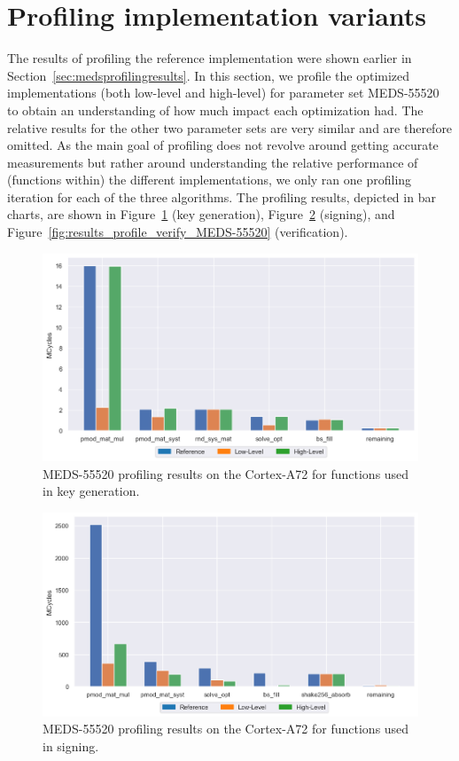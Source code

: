 \documentclass[11pt,a4paper]{report}
\theoremstyle{definition}
\begin{document}
\section{Profiling implementation variants}
\label{sec:profilingoptimizations}
The results of profiling the reference implementation were shown earlier in Section~\ref{sec:medsprofilingresults}. In this section, we profile the optimized implementations (both low-level and high-level) for parameter set MEDS-55520 to obtain an understanding of how much impact each optimization had. The relative results for the other two parameter sets are very similar and are therefore omitted. As the main goal of profiling does not revolve around getting accurate measurements but rather around understanding the relative performance of (functions within) the different implementations, we only ran one profiling iteration for each of the three algorithms. The profiling results, depicted in bar charts, are shown in Figure~\ref{fig:results_profile_keygen_MEDS-55520} (key generation), Figure~\ref{fig:results_profile_signing_MEDS-55520} (signing), and Figure~\ref{fig:results_profile_verify_MEDS-55520} (verification).

\begin{figure}
  \centering
  \includegraphics[width=\textwidth]{plots/barplot_MEDS-55520_profile_keygen.png}
  \caption{MEDS-55520 profiling results on the Cortex-A72 for functions used in key generation.}
  \label{fig:results_profile_keygen_MEDS-55520}
\end{figure}

\begin{figure}
  \centering
  \includegraphics[width=\textwidth]{plots/barplot_MEDS-55520_profile_sign.png}
  \caption{MEDS-55520 profiling results on the Cortex-A72 for functions used in signing.}
  \label{fig:results_profile_signing_MEDS-55520}
\end{figure}
\end{document}
